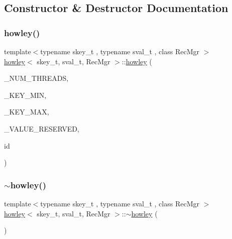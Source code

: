 \subsection{Constructor \& Destructor Documentation}
\mbox{\label{classhowley_ac5d2f61eedc19a5b2f5db14421682b4c}} 
\subsubsection{\texorpdfstring{howley()}{howley()}}
{\footnotesize\ttfamily template$<$typename skey\+\_\+t , typename sval\+\_\+t , class Rec\+Mgr $>$ \\
\hyperlink{classhowley}{howley}$<$ skey\+\_\+t, sval\+\_\+t, Rec\+Mgr $>$\+::\hyperlink{classhowley}{howley} (\begin{DoxyParamCaption}\item[{const int}]{\+\_\+\+N\+U\+M\+\_\+\+T\+H\+R\+E\+A\+DS,  }\item[{const skey\+\_\+t \&}]{\+\_\+\+K\+E\+Y\+\_\+\+M\+IN,  }\item[{const skey\+\_\+t \&}]{\+\_\+\+K\+E\+Y\+\_\+\+M\+AX,  }\item[{const sval\+\_\+t \&}]{\+\_\+\+V\+A\+L\+U\+E\+\_\+\+R\+E\+S\+E\+R\+V\+ED,  }\item[{unsigned int}]{id }\end{DoxyParamCaption})\hspace{0.3cm}{\ttfamily [inline]}}

\mbox{\label{classhowley_a7683fe814e9483ec72e02b552965d9a8}} 
\subsubsection{\texorpdfstring{$\sim$howley()}{~howley()}}
{\footnotesize\ttfamily template$<$typename skey\+\_\+t , typename sval\+\_\+t , class Rec\+Mgr $>$ \\
\hyperlink{classhowley}{howley}$<$ skey\+\_\+t, sval\+\_\+t, Rec\+Mgr $>$\+::$\sim$\hyperlink{classhowley}{howley} (\begin{DoxyParamCaption}{ }\end{DoxyParamCaption})\hspace{0.3cm}{\ttfamily [inline]}}



